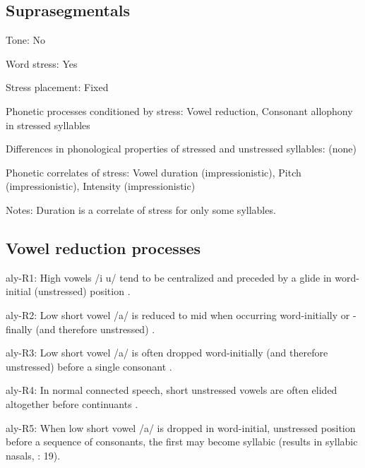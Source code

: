 {\subsection*{Suprasegmentals}
\begin{appendixdesc}
\item[Tone:] No

\item[Word stress:] Yes

\item[Stress placement:] Fixed

\item[Phonetic processes conditioned by stress:] Vowel reduction, Consonant allophony in stressed syllables

\item[Differences in phonological properties of stressed and unstressed syllables:] (none)

\item[Phonetic correlates of stress:] Vowel duration (impressionistic), Pitch (impressionistic), Intensity (impressionistic)

\item[Notes:] Duration is a correlate of stress for only some syllables.
\end{appendixdesc}
\subsection*{Vowel reduction processes}
\begin{appendixdesc}

\item[aly-R1:] High vowels /i u/ tend to be centralized and preceded by a glide in word-initial (unstressed) position \citep[25]{Yallop1977}.

\item[aly-R2:] Low short vowel /a/ is reduced to mid when occurring word-initially or -finally (and therefore unstressed) \citep[25]{Yallop1977}.

\item[aly-R3:] Low short vowel /a/ is often dropped word-initially (and therefore unstressed) before a single consonant \citep[28]{Yallop1977}.

\item[aly-R4:] In normal connected speech, short unstressed vowels are often elided altogether before continuants \citep[27]{Yallop1977}.

\item[aly-R5:] When low short vowel /a/ is dropped in word-initial, unstressed position before a sequence of consonants, the first may become syllabic (results in syllabic nasals, \citealt{Yallop1977}: 19).
\end{appendixdesc}
}
